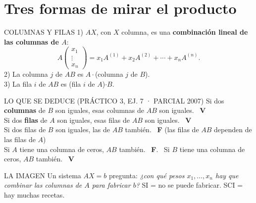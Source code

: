 \section{Tres formas de mirar el producto}
\begin{sello}{COLUMNAS Y FILAS}
1) $AX$, con $X$ columna, es una \textbf{combinación lineal de las columnas de $A$}:
\[A\begin{pmatrix}x_1\\\vdots\\x_n\end{pmatrix}=x_1A^{(1)}+x_2A^{(2)}+\cdots+x_nA^{(n)}.\]
2) La columna $j$ de $AB$ es $A\cdot$(columna $j$ de $B$).\\[2pt]
3) La fila $i$ de $AB$ es (fila $i$ de $A$)$\cdot B$.
\end{sello}
\begin{memo}{LO QUE SE DEDUCE (PRÁCTICO 3, EJ. 7 · PARCIAL 2007)}
Si dos \textbf{columnas} de $B$ son iguales, esas columnas de $AB$ son iguales. \ \textbf{V}\\
Si dos \textbf{filas} de $A$ son iguales, esas filas de $AB$ son iguales. \ \textbf{V}\\
Si dos filas de $B$ son iguales, las de $AB$ también. \ \textbf{F} (las filas de $AB$ dependen de las filas de $A$)\\
Si $A$ tiene una columna de ceros, $AB$ también. \ \textbf{F}. \ Si $B$ tiene una columna de ceros, $AB$ también. \ \textbf{V}
\end{memo}
\begin{tip}{LA IMAGEN}
Un sistema $AX=b$ pregunta: \emph{¿con qué pesos $x_1,\dots,x_n$ hay que combinar las columnas de $A$ para fabricar $b$?} SI = no se puede fabricar. SCI = hay muchas recetas.
\end{tip}

